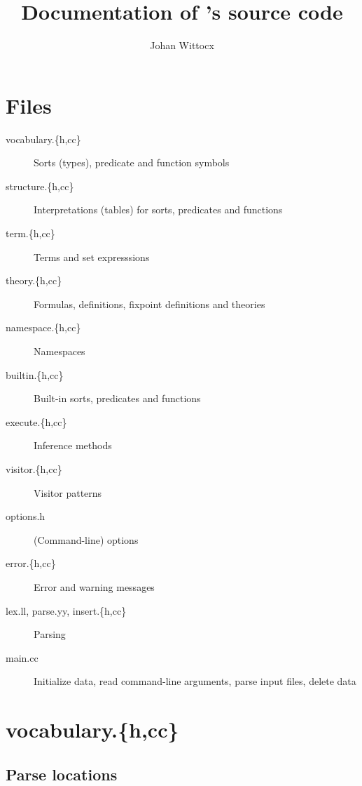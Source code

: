 \documentclass{article}
\title{Documentation of \gidl's source code}
\author{Johan Wittocx}
\begin{document}
\maketitle

\section{Files}

\begin{description}
	\item[vocabulary.\{h,cc\}] Sorts (types), predicate and function symbols
	\item[structure.\{h,cc\}] Interpretations (tables) for sorts, predicates and functions
	\item[term.\{h,cc\}] Terms and set expresssions
	\item[theory.\{h,cc\}] Formulas, definitions, fixpoint definitions and theories
	\item[namespace.\{h,cc\}] Namespaces
	\item[builtin.\{h,cc\}] Built-in sorts, predicates and functions
	\item[execute.\{h,cc\}] Inference methods
	\item[visitor.\{h,cc\}] Visitor patterns
	\item[options.h] (Command-line) options
	\item[error.\{h,cc\}] Error and warning messages
	\item[lex.ll, parse.yy, insert.\{h,cc\}] Parsing
	\item[main.cc] Initialize data, read command-line arguments, parse input files, delete data
\end{description}

\section{vocabulary.\{h,cc\}}

\subsection*{Parse locations}
\end{document}

